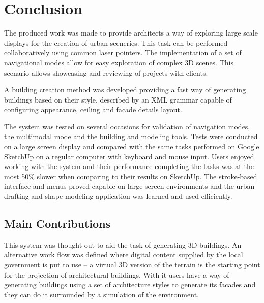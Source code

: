 \chapter{Conclusion}



The produced work was made to provide architects a way
of exploring large scale displays for the creation of urban sceneries.
This task can be performed collaboratively using common laser pointers.
The implementation of a set of navigational modes allow for easy
exploration of complex 3D scenes.
This scenario allows showcasing and reviewing of projects with clients.


A building creation method was developed providing a fast way
of generating buildings based on their style, described by an XML grammar
capable of configuring appearance, ceiling and facade details layout.

The system was tested on several occasions for validation of navigation modes,
the multimodal mode and the building and modeling tools.
Tests were conducted on a large screen display and compared with the same tasks
performed on Google SketchUp on a regular computer with keyboard and mouse input.
Users enjoyed working with the system and their performance completing the tasks
was at the most 50\% slower when comparing to their results on SketchUp.
The stroke-based interface and menus proved capable on large screen environments
and the urban drafting and shape modeling application was learned and used efficiently.



\section{Main Contributions}

This system was thought out to aid the task of generating 3D buildings.
An alternative work flow was defined where digital content supplied by
the local government is put to use -- a virtual 3D
version of the terrain is the starting point for the projection of
architectural buildings.
With it users have a way of generating buildings using a set of
architecture styles to generate its facades and they can do it surrounded by a simulation of the environment.

